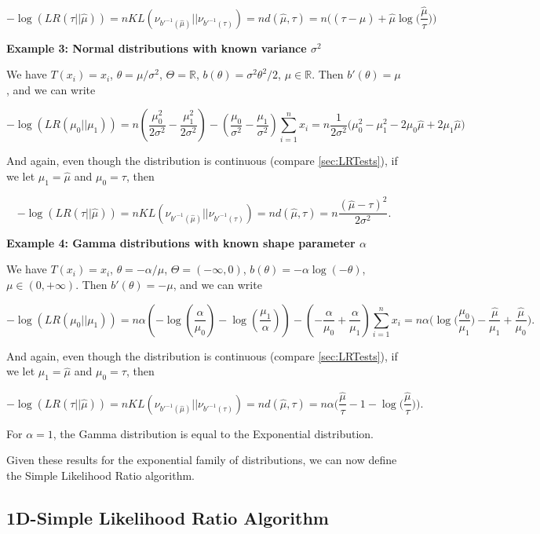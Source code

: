 \documentclass[11pt,]{article}
\begin{document}
\[
-\log(LR(\tau||\hat{\mu})) = nKL(\nu_{b'^{-1}(\hat{\mu})}||\nu_{b'^{-1}(\tau)}) = nd(\hat{\mu},\tau) = n\Big((\tau - \hat{\mu}) + \hat{\mu}\log\Big(\frac{\hat{\mu}}{\tau}\Big)\Big)
\]

\textbf{Example 3: Normal distributions with known variance
\(\sigma^2\)}

We have \(T(x_i) = x_i\), \(\theta = \mu/\sigma^2\),
\(\Theta = \mathbb{R}\), \(b(\theta) = \sigma^2\theta^2/2\),
\(\mu \in \mathbb{R}\). Then \(b'(\theta) = \mu\), and we can write

\[
-\log(LR(\mu_0||\mu_1)) = n (\frac{\mu_0^2}{2\sigma^2} - \frac{\mu_1^2}{2\sigma^2}) - (\frac{\mu_0}{\sigma^2} - \frac{\mu_1}{\sigma^2})\sum_{i=1}^nx_i = n\frac{1}{2\sigma^2}\Big(\mu_0^2-\mu_1^2 - 2\mu_0\hat{\mu} + 2\mu_1\hat{\mu}\Big)
\]

And again, even though the distribution is continuous (compare
\autoref{sec:LRTests}), if we let \(\mu_1 = \hat{\mu}\) and
\(\mu_0 = \tau\), then

\[
-\log(LR(\tau||\hat{\mu})) = nKL(\nu_{b'^{-1}(\hat{\mu})}||\nu_{b'^{-1}(\tau)}) = nd(\hat{\mu},\tau) = n\frac{(\hat{\mu} - \tau)^2}{2\sigma^2}.
\]

\textbf{Example 4: Gamma distributions with known shape parameter
\(\alpha\)}

We have \(T(x_i) = x_i\), \(\theta = -\alpha/\mu\),
\(\Theta = (-\infty, 0)\), \(b(\theta) = -\alpha \log(-\theta)\),
\(\mu \in (0,+\infty)\). Then \(b'(\theta) = -\mu\), and we can write

\[
-\log(LR(\mu_0||\mu_1)) = n\alpha(-\log(\frac{\alpha}{\mu_0}) - \log(\frac{\mu_1}{\alpha})) - (-\frac{\alpha}{\mu_0} + \frac{\alpha}{\mu_1})\sum_{i=1}^{n}x_i = n\alpha \Big(\log\big(\frac{\mu_0}{\mu_1}\big) - \frac{\hat{\mu}}{\mu_1} + \frac{\hat{\mu}}{\mu_0}\Big).
\]

And again, even though the distribution is continuous (compare
\autoref{sec:LRTests}), if we let \(\mu_1 = \hat{\mu}\) and
\(\mu_0 = \tau\), then

\[
-\log(LR(\tau||\hat{\mu})) = nKL(\nu_{b'^{-1}(\hat{\mu})}||\nu_{b'^{-1}(\tau)}) = nd(\hat{\mu},\tau) = n\alpha \Big(\frac{\hat{\mu}}{\tau} - 1 - \log\big(\frac{\hat{\mu}}{\tau}\big)\Big).
\]

For \(\alpha = 1\), the Gamma distribution is equal to the Exponential
distribution.

Given these results for the exponential family of distributions, we can
now define the Simple Likelihood Ratio algorithm.

\subsection{\texorpdfstring{1D-Simple Likelihood Ratio Algorithm
\label{sec:1DSLR}}{1D-Simple Likelihood Ratio Algorithm }}\label{d-simple-likelihood-ratio-algorithm}
\end{document}
